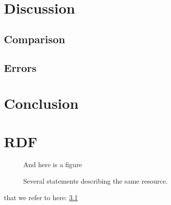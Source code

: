 \documentclass[a4paper,11pt]{kth-mag}
\begin{document}
\chapter{Discussion}

\section{Comparison}
\section{Errors}

\chapter{Conclusion}
\cite{MadeHow}
\renewcommand{\bibname}{References}



\appendix
\addappheadtotoc
\chapter{RDF}\label{appA}

\begin{figure}[ht]
\begin{center}
And here is a figure
\caption{\small{Several statements describing the same resource.}}\label{RDF_4}
\end{center}
\end{figure}

that we refer to here: \ref{RDF_4}
\end{document}
